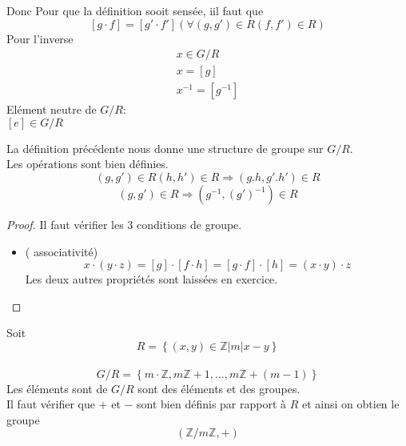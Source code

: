 \documentclass[../main.tex]{subfiles}
\begin{document}
Donc Pour que la définition sooit sensée, iil faut que
\[ 
	[ g\cdot f]= [ g'\cdot f'] ( \forall ( g,g')\in R ( f,f')\in R)
\]
Pour l'inverse\\
\begin{align*}
x\in G /R\\
x =[g]\\
x^{-1} = [ g^{-1}]
\end{align*}
Elément neutre de $G/ R$:\\
$[e] \in G /R$
\begin{propo}
La définition précédente nous donne une structure de groupe sur $G /R$.\\

Les opérations sont bien définies.
\[ 
	( g,g')\in R ( h,h')\in R \Rightarrow ( g.h, g'.h')\in R
\]
\[ 
	( g,g')\in R \Rightarrow ( g^{-1}, ( g')^{-1})\in R
\]

\end{propo}

\begin{proof}
Il faut vérifier les 3 conditions de groupe.\\
\begin{itemize}
	\item ( associativité)
		\[ 
			x\cdot ( y\cdot z)= [ g] \cdot [ f\cdot h]= [ g \cdot f] \cdot [ h] = ( x\cdot y)\cdot z
		\]
		Les deux autres propriétés sont laissées en exercice.
\end{itemize}

\end{proof}
\begin{exemple}[$G = \mathbb{Z}, +$]
Soit
\[ 
	R = \left\{ ( x,y) \in \mathbb{Z} \vert m | x-y \right\} 
\]
\hr\\
\[ 
	G /R = \left\{ m\cdot \mathbb{Z}, m \mathbb{Z}+1, \ldots, m\mathbb{Z}+ ( m-1) \right\} 
\]
Les éléments sont de $G /R$ sont des éléments et des groupes.\\
Il faut vérifier que $+$ et $-$ sont bien définis par rapport à $R$ et ainsi on obtien le groupe
\[ 
	( \mathbb{Z} / m \mathbb{Z} , +) 
\]


\end{exemple}
\end{document}
